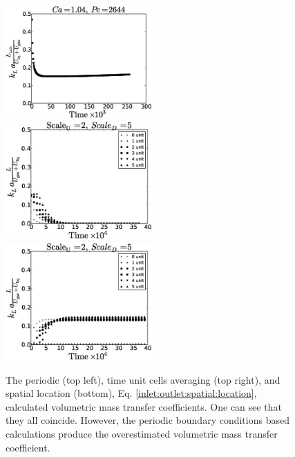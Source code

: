 \documentclass{article}
\begin{document}
\begin{figure}
\includegraphics[width=0.5\textwidth]{Figures/volume_ca_104_scaleu2scaled5.eps}
\includegraphics[width=0.5\textwidth]{Figures/aver_moving_window6scaleu2scaled5.eps}\\
\includegraphics[width=0.5\textwidth]{Figures/flux_moving_window6scaleu2scaled5.eps}\\
\caption{The periodic (top left), time unit cells averaging (top right), and spatial location
(bottom), Eq. \ref{inlet:outlet:spatial:location}, calculated  volumetric mass transfer
coefficients. One can see that they all coincide. However, the periodic boundary conditions based
calculations produce the overestimated volumetric mass transfer
coefficient. \label{fig:periodic:ca1040}}
\end{figure}
\end{document}
